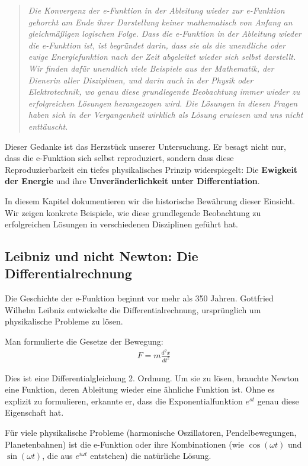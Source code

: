 \documentclass[a4paper,12pt,twoside]{report}
\theoremstyle{definition}
\begin{document}
\begin{quote}
\textit{Die Konvergenz der e-Funktion in der Ableitung wieder zur e-Funktion gehorcht am Ende ihrer Darstellung keiner mathematisch von Anfang an gleichmäßigen logischen Folge. Dass die e-Funktion in der Ableitung wieder die e-Funktion ist, ist begründet darin, dass sie als die unendliche oder ewige Energiefunktion nach der Zeit abgeleitet wieder sich selbst darstellt. Wir finden dafür unendlich viele Beispiele aus der Mathematik, der Dienerin aller Disziplinen, und darin auch in der Physik oder Elektrotechnik, wo genau diese grundlegende Beobachtung immer wieder zu erfolgreichen Lösungen herangezogen wird. Die Lösungen in diesen Fragen haben sich in der Vergangenheit wirklich als Lösung erwiesen und uns nicht enttäuscht.}
\end{quote}

Dieser Gedanke ist das Herzstück unserer Untersuchung. Er besagt nicht nur, dass die e-Funktion sich selbst reproduziert, sondern dass diese Reproduzierbarkeit ein tiefes physikalisches Prinzip widerspiegelt: Die \textbf{Ewigkeit der Energie} und ihre \textbf{Unveränderlichkeit unter Differentiation}.

In diesem Kapitel dokumentieren wir die historische Bewährung dieser Einsicht. Wir zeigen konkrete Beispiele, wie diese grundlegende Beobachtung zu erfolgreichen Lösungen in verschiedenen Disziplinen geführt hat.

\subsection{Leibniz und nicht Newton: Die Differentialrechnung}

Die Geschichte der e-Funktion beginnt vor mehr als 350 Jahren. Gottfried Wilhelm Leibniz entwickelte die Differentialrechnung, ursprünglich um physikalische Probleme zu lösen.

Man formulierte die Gesetze der Bewegung:
\begin{align}
	F = m \frac{d^2 x}{dt^2}
\end{align}

Dies ist eine Differentialgleichung 2. Ordnung. Um sie zu lösen, brauchte Newton eine Funktion, deren Ableitung wieder eine ähnliche Funktion ist. Ohne es explizit zu formulieren, erkannte er, dass die Exponentialfunktion $e^{st}$ genau diese Eigenschaft hat.

Für viele physikalische Probleme (harmonische Oszillatoren, Pendelbewegungen, Planetenbahnen) ist die e-Funktion oder ihre Kombinationen (wie $\cos(\omega t)$ und $\sin(\omega t)$, die aus $e^{i\omega t}$ entstehen) die natürliche Lösung.
\end{document}
